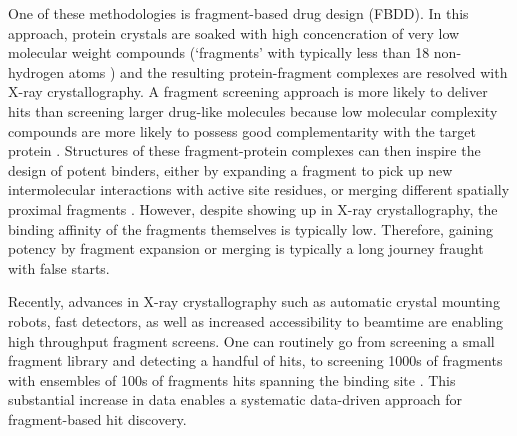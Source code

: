 One of these methodologies is fragment-based drug design (FBDD). In this approach, protein crystals are soaked with high concencration of very low molecular weight compounds (`fragments' with typically less than 18 non-hydrogen atoms \cite{David2017FBLD}) and the resulting protein-fragment complexes are resolved with X-ray crystallography. A fragment screening approach is more likely to deliver hits than screening larger drug-like molecules because low molecular complexity compounds are more likely to possess good complementarity with the target protein \cite{hann2001molecular}. Structures of these fragment-protein complexes can then inspire the design of potent binders, either by expanding a fragment to pick up new intermolecular interactions with active site residues, or merging different spatially proximal fragments \cite{Ichihara2011FragLinking, Yu2021FragLinkingEntropy}. However, despite showing up in X-ray crystallography, the binding affinity of the fragments themselves is typically low. Therefore, gaining potency by fragment expansion or merging is typically a long journey fraught with false starts. 



Recently, advances in X-ray crystallography such as automatic crystal mounting robots, fast detectors, as well as increased accessibility to beamtime are enabling high throughput fragment screens. One can routinely go from screening a small fragment library and detecting a handful of hits, to screening 1000s of fragments with ensembles of 100s of fragments hits spanning the binding site \cite{Schiebel2016HighThroughput, Douangamath2020XChem}. This substantial increase in data enables a systematic data-driven approach for fragment-based hit discovery. 



